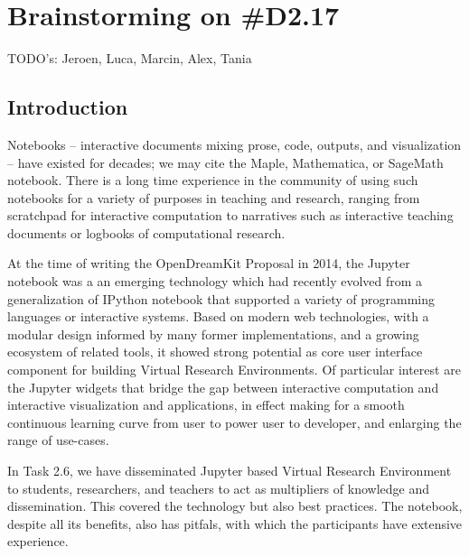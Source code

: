 \documentclass{deliverablereport}
\author{Mike Croucher, Hans Fanghor and Nicolas M. Thiéry}
\begin{document}
\maketitle
\githubissuedescription



\hypertarget{brainstorming-on-d2.17}{%
\section{Brainstorming on \#D2.17}\label{brainstorming-on-d2.17}}

TODO's: Jeroen, Luca, Marcin, Alex, Tania

\hypertarget{introduction}{%
\subsection{Introduction}\label{introduction}}

Notebooks -- interactive documents mixing prose, code, outputs, and
visualization -- have existed for decades; we may cite the Maple,
Mathematica, or SageMath notebook. There is a long time experience in
the community of using such notebooks for a variety of purposes in
teaching and research, ranging from scratchpad for interactive
computation to narratives such as interactive teaching documents or
logbooks of computational research.

At the time of writing the OpenDreamKit Proposal in 2014, the Jupyter
notebook was a an emerging technology which had recently evolved from a
generalization of IPython notebook that supported a variety of
programming languages or interactive systems. Based on modern web
technologies, with a modular design informed by many former
implementations, and a growing ecosystem of related tools, it showed
strong potential as core user interface component for building Virtual
Research Environments. Of particular interest are the Jupyter widgets
that bridge the gap between interactive computation and interactive
visualization and applications, in effect making for a smooth continuous
learning curve from user to power user to developer, and enlarging the
range of use-cases.

In Task 2.6, we have disseminated Jupyter based Virtual Research
Environment to students, researchers, and teachers to act as multipliers
of knowledge and dissemination. This covered the technology but also
best practices. The notebook, despite all its benefits, also has
pitfals, with which the participants have extensive experience.
\end{document}
